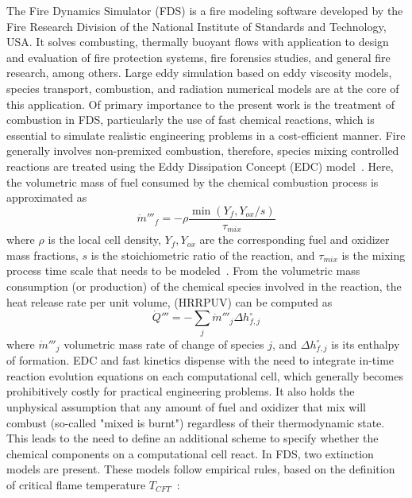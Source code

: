 \documentclass[12pt,letterpaper]{article}
\begin{document}
\begin{flushleft}
The Fire Dynamics Simulator (FDS) is a fire modeling software developed by the Fire Research Division of the National Institute of Standards and Technology, USA. It solves combusting, thermally buoyant flows with application to design and evaluation of fire protection systems, fire forensics studies, and general fire research, among others. Large eddy simulation based on eddy viscosity models, species transport, combustion, and radiation numerical models are at the core of this application. Of primary importance to the present work is the treatment of combustion in FDS, particularly the use of fast chemical reactions, which is essential to simulate realistic engineering problems in a cost-efficient manner. Fire generally involves non-premixed combustion, therefore, species mixing controlled reactions are treated using the Eddy Dissipation Concept (EDC) model~\cite{Magnussen:1}. Here, the volumetric mass of fuel consumed by the chemical combustion process is approximated as
%
\begin{equation}
  \dot{m}'''_f = - \rho \frac{\min({Y}_f,{Y}_{ox}/s)}{\tau_{mix}}
\end{equation}
where $\rho$ is the local cell density, ${Y}_f,{Y}_{ox}$ are the corresponding fuel and oxidizer mass fractions, $s$ is the stoichiometric ratio of the reaction, and $\tau_{mix}$ is the mixing process time scale that needs to be modeled~\cite{FDS_Tech_Guide}. From the volumetric mass consumption (or production) of the chemical species involved in the reaction, the heat release rate per unit volume, (HRRPUV)  can be computed as
%
\begin{equation}
  \dot{Q}''' = - \sum_j{\dot{m}'''_j \Delta h_{f,j}^\circ}
  \label{eq:HRRPUV}
\end{equation}
where $\dot{m}'''_j$ volumetric mass rate of change of species $j$, and $\Delta h_{f,j}^\circ$ is its enthalpy of formation. EDC and fast kinetics dispense with the need to integrate in-time reaction evolution equations on each computational cell, which generally becomes prohibitively costly for practical engineering problems. It also holds the unphysical assumption that any amount of fuel and oxidizer that mix will combust (so-called "mixed is burnt") regardless of their thermodynamic state. This leads to the need to define an additional scheme to specify whether the chemical components on a computational cell react. In FDS, two extinction models are present. These models follow empirical rules, based on the definition of critical flame temperature $T_{CFT}$~\cite{SFPE:Beyler}:
\begin{itemize}

\end{itemize}
\end{flushleft}
\end{document}
